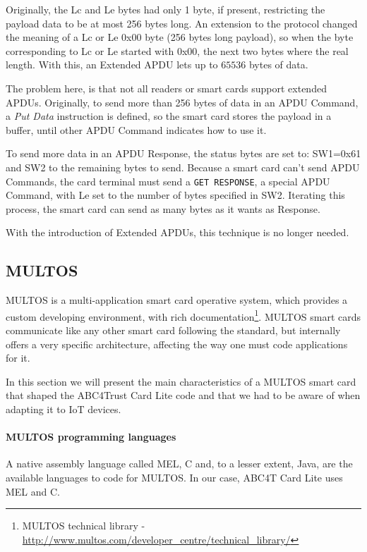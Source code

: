 Originally, the Lc and Le bytes had only 1 byte, if present, restricting the payload data to be at most 256 bytes long. An extension to the protocol changed the meaning of a Lc or Le 0x00 byte (256 bytes long payload), so when the byte corresponding to Lc or Le started with 0x00, the next two bytes where the real length.  With this, an Extended APDU lets up to $65536$ bytes of data.

The problem here, is that not all readers or smart cards support extended APDUs. Originally, to send more than 256 bytes of data in an APDU Command, a \textit{Put Data} instruction is defined, so the smart card stores the payload in a buffer, until other APDU Command indicates how to use it.

To send more data in an APDU Response, the status bytes are set to: SW1=0x61 and SW2 to the remaining bytes to send. Because a smart card can't send APDU Commands, the card terminal must send a \texttt{GET RESPONSE}, a special APDU Command, with Le set to the number of bytes specified in SW2. Iterating this process, the smart card can send as many bytes as it wants as Response.

With the introduction of Extended APDUs, this technique is no longer needed.






\subsection{MULTOS}

MULTOS is a multi-application smart card operative system, which provides a custom developing environment, with rich documentation\footnote{MULTOS technical library - \url{http://www.multos.com/developer_centre/technical_library/}}. MULTOS smart cards communicate like any other smart card following the standard, but internally offers a very specific architecture, affecting the way one must code applications for it.

In this section we will present the main characteristics of a MULTOS smart card that shaped the ABC4Trust Card Lite code and that we had to be aware of when adapting it to IoT devices.


\paragraph{MULTOS programming languages} A native assembly language called MEL, C and, to a lesser extent, Java, are the available languages to code for MULTOS. In our case, ABC4T Card Lite uses MEL and C.

